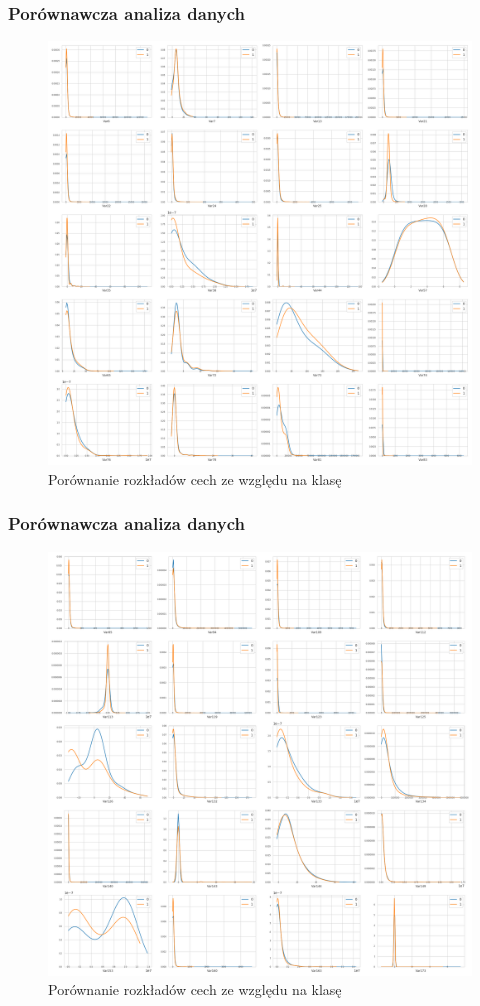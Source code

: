 \documentclass{beamer}
\begin{document}
    \begin{frame}
        \frametitle{Porównawcza analiza danych}
        \begin{figure}
            \centering
            \includegraphics[width=0.7\linewidth]{../images/feature-distribution-0-20.png}
            \caption{Porównanie rozkładów cech ze względu na klasę}
            \label{fig:feature-distribution-0-20}
        \end{figure}
    \end{frame}

    \begin{frame}
        \frametitle{Porównawcza analiza danych}
        \begin{figure}
            \centering
            \includegraphics[width=0.7\linewidth]{../images/feature-distribution-20-40.png}
            \caption{Porównanie rozkładów cech ze względu na klasę}
            \label{fig:feature-distribution-20-40}
        \end{figure}
    \end{frame}
\end{document}
